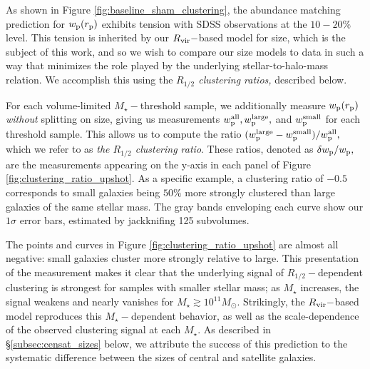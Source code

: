 \documentclass[usenatbib,usegraphicx,letterpaper]{mn2e}
\newcommand{\rhalf}{R_{1/2}}
\newcommand{\mstar}{M_{\star}}
\newcommand{\rvir}{R_{\rm vir}}
\newcommand{\rproj}{r_{\rm p}}
\newcommand{\wproj}{w_{\rm p}}
\newcommand{\wplarge}{w_{\rm p}^{\rm large}}
\newcommand{\wpsmall}{w_{\rm p}^{\rm small}}
\newcommand{\wpall}{w_{\rm p}^{\rm all}}
\newcommand{\msun}{M_\odot}
\begin{document}
As shown in Figure \ref{fig:baseline_sham_clustering}, the abundance matching prediction for $\wproj(\rproj)$ exhibits tension with SDSS observations at the $10-20\%$ level. This tension is inherited by our $\rvir-$based model for size, which is the subject of this work, and so we wish to compare our size models to data in such a way that minimizes the role played by the underlying stellar-to-halo-mass relation. We accomplish this using the {\em $\rhalf$ clustering ratios,} described below.

For each volume-limited $\mstar-$threshold sample, we additionally measure $\wproj(\rproj)$ {\em without} splitting on size, giving us measurements $\wpall, \wplarge,$ and $\wpsmall$ for each threshold sample. This allows us to compute the ratio $(\wplarge-\wpsmall)/\wpall,$ which we refer to as {\em the $\rhalf$ clustering ratio}. These ratios, denoted as $\delta\wproj/\wproj,$ are the measurements appearing on the y-axis in each panel of Figure \ref{fig:clustering_ratio_upshot}. As a specific example, a clustering ratio of $-0.5$ corresponds to small galaxies being $50\%$ more strongly clustered than large galaxies of the same stellar mass. The gray bands enveloping each curve show our $1\sigma$ error bars, estimated by jackknifing 125 subvolumes.

The points and curves in Figure \ref{fig:clustering_ratio_upshot} are almost all negative: small galaxies cluster more strongly relative to large. This presentation of the measurement makes it clear that the underlying signal of $\rhalf-$dependent clustering is strongest for samples with smaller stellar mass; as $\mstar$ increases, the signal weakens and nearly vanishes for $\mstar\gtrsim10^{11}\msun.$ Strikingly, the $\rvir-$based model reproduces this $\mstar-$dependent behavior, as well as the scale-dependence of the observed clustering signal at each $\mstar.$ As described in \S\ref{subsec:censat_sizes} below, we attribute the success of this prediction to the systematic difference between the sizes of central and satellite galaxies.

\end{document}
